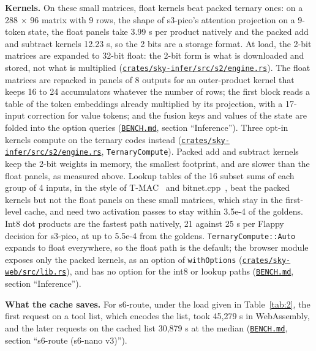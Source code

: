 \documentclass[10pt]{article}
\begin{document}
\textbf{Kernels.} On these small matrices, float kernels beat packed ternary ones: on a 288 $\times$ 96 matrix with 9 rows, the shape of s3-pico's attention projection on a 9-token state, the float panels take 3.99 \textmu{}s per product natively and the packed add and subtract kernels 12.23 \textmu{}s, so the 2 bits are a storage format. At load, the 2-bit matrices are expanded to 32-bit float: the 2-bit form is what is downloaded and stored, not what is multiplied (\href{https://github.com/maxgfr/skycmd/blob/main/crates/sky-infer/src/s2/engine.rs}{\texttt{crates/\allowbreak{}sky-infer/\allowbreak{}src/\allowbreak{}s2/\allowbreak{}engine.rs}}). The float matrices are repacked in panels of 8 outputs for an outer-product kernel that keeps 16 to 24 accumulators whatever the number of rows; the first block reads a table of the token embeddings already multiplied by its projection, with a 17-input correction for value tokens; and the fusion keys and values of the state are folded into the option queries (\href{https://github.com/maxgfr/skycmd/blob/main/BENCH.md}{\texttt{BENCH.md}}, section ``Inference''). Three opt-in kernels compute on the ternary codes instead (\href{https://github.com/maxgfr/skycmd/blob/main/crates/sky-infer/src/s2/engine.rs}{\texttt{crates/\allowbreak{}sky-infer/\allowbreak{}src/\allowbreak{}s2/\allowbreak{}engine.rs}}, \texttt{TernaryCompute}). Packed add and subtract kernels keep the 2-bit weights in memory, the smallest footprint, and are slower than the float panels, as measured above. Lookup tables of the 16 subset sums of each group of 4 inputs, in the style of T-MAC~\cite{wei2024tmac} and bitnet.cpp~\cite{wang2025bitnetcpp}, beat the packed kernels but not the float panels on these small matrices, which stay in the first-level cache, and need two activation passes to stay within 3.5e-4 of the goldens. Int8 dot products are the fastest path natively, 21 against 25 \textmu{}s per Flappy decision for s3-pico, at up to 5.5e-4 from the goldens. \texttt{TernaryCompute::Auto} expands to float everywhere, so the float path is the default; the browser module exposes only the packed kernels, as an option of \texttt{withOptions} (\href{https://github.com/maxgfr/skycmd/blob/main/crates/sky-web/src/lib.rs}{\texttt{crates/\allowbreak{}sky-web/\allowbreak{}src/\allowbreak{}lib.rs}}), and has no option for the int8 or lookup paths (\href{https://github.com/maxgfr/skycmd/blob/main/BENCH.md}{\texttt{BENCH.md}}, section ``Inference'').

\textbf{What the cache saves.} For s6-route, under the load given in Table~\ref{tab:2}, the first request on a tool list, which encodes the list, took 45,279 \textmu{}s in WebAssembly, and the later requests on the cached list 30,879 \textmu{}s at the median (\href{https://github.com/maxgfr/skycmd/blob/main/BENCH.md}{\texttt{BENCH.md}}, section ``s6-route (s6-nano v3)'').
\end{document}
